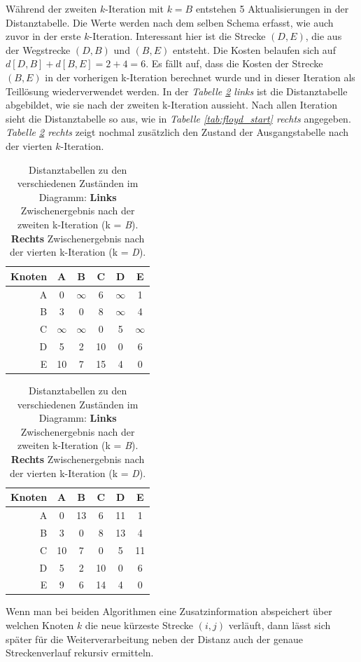 \documentclass[12pt]{article}
\begin{document}
Während der zweiten $k$-Iteration mit $k = B$ entstehen 5 Aktualisierungen in der Distanztabelle. Die Werte werden nach dem selben Schema erfasst, wie auch zuvor in der erste $k$-Iteration. Interessant hier ist die Strecke $(D,E)$, die aus der Wegstrecke $(D,B)$ und $(B,E)$ entsteht. Die Kosten belaufen sich auf $d[D,B] + d[B,E] = 2 + 4 = 6$. Es fällt auf, dass die Kosten der Strecke $(B,E)$ in der vorherigen k-Iteration berechnet wurde und in dieser Iteration als Teillösung wiederverwendet werden. In der \textit{Tabelle \ref{tab:floyd_zwischen} links} ist die Distanztabelle abgebildet, wie sie nach der zweiten k-Iteration aussieht. Nach allen Iteration sieht die Distanztabelle so aus, wie in \textit{Tabelle \ref{tab:floyd_start} rechts} angegeben. \textit{Tabelle \ref{tab:floyd_zwischen} rechts} zeigt nochmal zusätzlich den Zustand der  Ausgangstabelle nach der vierten $k$-Iteration. 
\begin{table}
\begin{tabular}{r||c|c|c|c|c}
	Knoten&A&B&C&D&E\\ \hline \hline
	A&0&$\infty$&6&$\infty$&1\\
	B&3&0&8&$\infty$&4\\
	C&$\infty$&$\infty$&0&5&$\infty$\\
	D&5&2&10&0&6\\
	E&10&7&15&4&0\\
\end{tabular}
\hspace*{20pt}
\begin{tabular}{r||c|c|c|c|c}
	Knoten&A&B&C&D&E\\ \hline \hline
	A&0&13&6&11&1\\
	B&3&0&8&13&4\\
	C&10&7&0&5&11\\
	D&5&2&10&0&6\\
	E&9&6&14&4&0\\
\end{tabular}
\caption{Distanztabellen zu den verschiedenen Zuständen im Diagramm: \textbf{Links} Zwischenergebnis nach der zweiten k-Iteration (k = \textit{B}).\\ \textbf{Rechts} Zwischenergebnis nach der vierten k-Iteration (k = \textit{D}).}
\label{tab:floyd_zwischen}
\end{table}

Wenn man bei beiden Algorithmen eine Zusatzinformation abspeichert über welchen Knoten $k$ die neue kürzeste Strecke $(i,j)$ verläuft, dann lässt sich später für die Weiterverarbeitung neben der Distanz auch der genaue Streckenverlauf rekursiv ermitteln.
\end{document}

